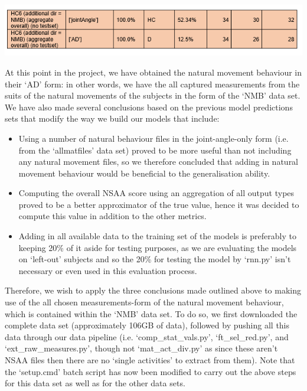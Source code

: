 \documentclass[12pt,twoside]{report}
\begin{document}
\begin{center}
\includegraphics[scale=0.8]{project_figures/fig11_28}
\end{center}

\quad At this point in the project, we have obtained the natural movement behaviour in their ‘AD’ form: in other words, we have the all captured measurements from the suits of the natural movements of the subjects in the form of the ‘NMB’ data set. We have also made several conclusions based on the previous model predictions sets that modify the way we build our models that include:

\begin{itemize}
	\item Using a number of natural behaviour files in the joint-angle-only form (i.e. from the ‘allmatfiles’ data set) proved to be more useful than not including any natural movement files, so we therefore concluded that adding in natural movement behaviour would be beneficial to the generalisation ability.
	\item Computing the overall NSAA score using an aggregation of all output types proved to be a better approximator of the true value, hence it was decided to compute this value in addition to the other metrics.
	\item Adding in all available data to the training set of the models is preferably to keeping 20\% of it aside for testing purposes, as we are evaluating the models on ‘left-out’ subjects and so the 20\% for testing the model by ‘rnn.py’ isn’t necessary or even used in this evaluation process.
\end{itemize}

\quad Therefore, we wish to apply the three conclusions made outlined above to making use of the all chosen measurements-form of the natural movement behaviour, which is contained within the ‘NMB’ data set. To do so, we first downloaded the complete data set (approximately 106GB of data), followed by pushing all this data through our data pipeline (i.e. ‘comp\_stat\_vals.py’, ‘ft\_sel\_red.py’, and ‘ext\_raw\_measures.py’, though not ‘mat\_act\_div.py’ as since these aren’t NSAA files then there are no ‘single activities’ to extract from them). Note that the ‘setup.cmd’ batch script has now been modified to carry out the above steps for this data set as well as for the other data sets.\\
\end{document}
